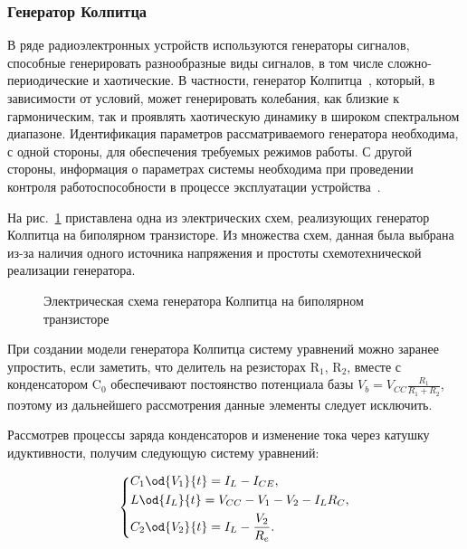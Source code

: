 \FloatBarrier
\subsubsection{Генератор Колпитца} %


В ряде радиоэлектронных устройств используются
генераторы сигналов, способные генерировать разнообразные виды  сигналов, в том числе
сложно-периодические и хаотические.
В частности, генератор  Колпитца~\cite{kennedy_chaos_colpitts,atu_asau21}, который, в
зависимости от условий,   может
генерировать  колебания,  как  близкие  к  гармоническим,  так  и  проявлять
хаотическую  динамику  в  широком  спектральном   диапазоне.   Идентификация
параметров рассматриваемого генератора  необходима,  с  одной  стороны,  для
обеспечения  требуемых  режимов  работы.  С  другой  стороны,  информация  о
параметрах системы необходима при проведении  контроля  работоспособности  в
процессе эксплуатации устройства~\cite{atu_apir2013}.

На рис.~\ref{atu:f:colp_schem} приставлена одна из электрических схем,
реализующих генератор Колпитца на биполярном транзисторе.
Из множества схем, данная была выбрана из-за наличия
одного источника напряжения и простоты схемотехнической реализации генератора.


\begin{figure}[htb!]
\begin{center}

\end{center}
\caption{Электрическая схема генератора Колпитца на биполярном транзисторе}
\label{atu:f:colp_schem}
\end{figure}

При создании модели генератора Колпитца систему уравнений можно
заранее упростить, если заметить, что
делитель на резисторах
$\mathrm{R}_1$, $\mathrm{R}_2$,
вместе с конденсатором
$\mathrm{C}_0$ обеспечивают
постоянство потенциала базы
$V_b = V_{CC} \frac{R_1}{R_1+R_2}$,
поэтому из дальнейшего рассмотрения данные элементы следует
исключить.

Рассмотрев процессы заряда конденсаторов и изменение тока через
катушку идуктивности, получим следующую систему уравнений:

\begin{equation}
\label{atu:eq:colp_phys}
\begin{dcases}
  C_1 \od{V_{1}}{t}  = I_L - I_{CE} , \\
  L   \od{I_L}{t}    = V_{CC} - V_{1} - V_{2} - I_L R_C , \\
  C_2 \od{V_{2}}{t}  = I_L - \frac{V_{2}}{R_e}.
\end{dcases}
\end{equation}


